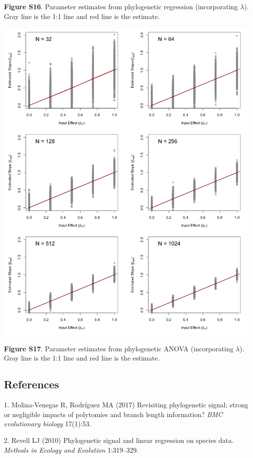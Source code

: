 \documentclass[
]{article}
\begin{document}
\textbf{Figure S16}. Parameter estimates from phylogenetic regression
(incorporating \(\lambda\)). Gray line is the 1:1 line and red line is
the estimate.

\includegraphics[width=0.95\linewidth]{fig.S17}

\textbf{Figure S17}. Parameter estimates from phylogenetic ANOVA
(incorporating \(\lambda\)). Gray line is the 1:1 line and red line is
the estimate.

\newpage

\hypertarget{references}{%
\subsection*{References}\label{references}}

\hypertarget{refs}{}
\leavevmode\hypertarget{ref-MolinaVenegas2017}{}%
1. Molina-Venegas R, Rodríguez MA (2017) Revisiting phylogenetic signal;
strong or negligible impacts of polytomies and branch length
information? \emph{BMC evolutionary biology} 17(1):53.

\leavevmode\hypertarget{ref-Revell2010}{}%
2. Revell LJ (2010) Phylogenetic signal and linear regression on species
data. \emph{Methods in Ecology and Evolution} 1:319--329.
\end{document}
